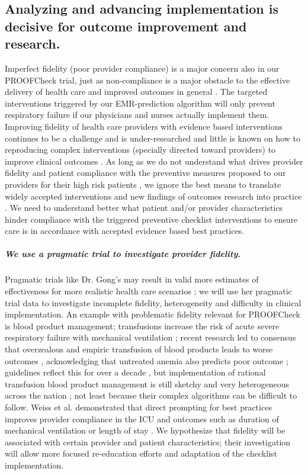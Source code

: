 \documentclass[11pt,notitlepage]{article}
\begin{document}
\subsection*{Analyzing and advancing implementation is decisive for outcome improvement and research.}
Imperfect fidelity (poor provider compliance) is a major concern also in our PROOFCheck trial, just as non-compliance is a major obstacle to the effective delivery of health care and improved outcomes in general
\cite{Duncan_16710766}. The targeted interventions triggered by our EMR-prediction algorithm will only prevent respiratory failure if our physicians and nurses actually implement them. Improving fidelity of health care providers with evidence based interventions continues to be a challenge and is under-researched \cite{Davis_7650822} and little is known on how to reproducing complex interventions (specially directed toward providers) to improve clinical outcomes \cite{Campbell_10987780}. As long as we do not understand what drives provider fidelity and patient compliance with the preventive measures proposed to our providers for their high risk patients  \cite{Mittman_15172904}, we ignore the best means to translate widely accepted interventions and new findings of outcomes research into practice \cite{Glasgow_17150029}. We need to understand better what patient and/or provider characteristics hinder compliance with the triggered preventive checklist interventions to ensure care is in accordance with accepted evidence based best practices.

\subparagraph*{We use a pragmatic trial to investigate provider fidelity.} Pragmatic trials like Dr. Gong's may result in valid more estimates of effectiveness for more realistic health care scenarios \cite{Selby_22824225,Tosh_21842618}; we will use her pragmatic trial data to investigate incomplete fidelity, heterogeneity and difficulty in clinical implementation. An example with problematic fidelity relevant for PROOFCheck is blood product management; transfusions increase the risk of acute severe respiratory failure with mechanical ventilation \cite{Kenz_24892308};  recent research led to consensus that overzealous and empiric transfusion of blood products leads to worse outcomes \cite{Hebert_9971864}, acknowledging that untreated anemia also predicts poor outcome \cite{Ranucci_22698773}; guidelines reflect this for over a decade \cite{ASA_25545654}, but implementation of rational transfusion blood product management is still sketchy and very heterogeneous across the nation \cite{Likosky_20488928}; not least because their complex algorithms can be difficult to follow. Weiss et al. demonstrated that direct prompting for best practices improves provider compliance in the ICU and outcomes such as duration of mechanical ventilation or length of stay \cite{Weiss_21616996}. We hypothesize that fidelity will be associated with certain provider and patient characteristics; their investigation will allow more focused re-education efforts and adaptation of the checklist implementation. 
\end{document}
